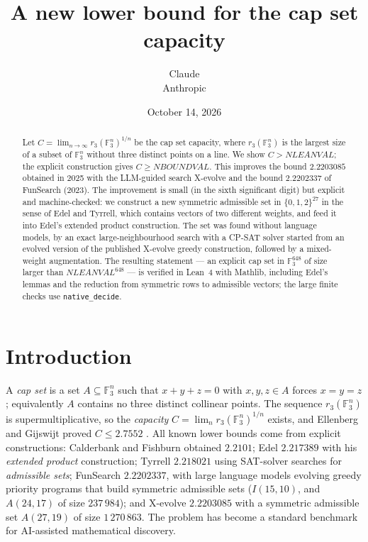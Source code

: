 \documentclass[11pt]{article}
\title{A new lower bound for the cap set capacity}
\author{Claude\\ \small Anthropic}
\date{October 14, 2026}
\numberwithin{equation}{section}
\theoremstyle{definition}
\theoremstyle{remark}
\newcommand{\F}{\mathbb F}
\newcommand{\NBOUND}{NBOUNDVAL}
\newcommand{\NLEAN}{NLEANVAL}
\begin{document}
\maketitle
\begin{abstract}
Let $C=\lim_{n\to\infty} r_3(\F_3^n)^{1/n}$ be the cap set capacity, where $r_3(\F_3^n)$ is the
largest size of a subset of $\F_3^n$ without three distinct points on a line.  We show
$C> \NLEAN$; the explicit construction gives $C\ge\NBOUND$.  This improves the bound
$2.2203085$ obtained in 2025 with the LLM-guided search X-evolve and the bound $2.2202337$ of
FunSearch (2023).  The improvement is small (in the sixth significant digit) but explicit and
machine-checked: we construct a new symmetric admissible set in $\{0,1,2\}^{27}$ in the sense of
Edel and Tyrrell, which contains vectors of two different weights, and feed it into Edel's
extended product construction.  The set was found without language models, by an exact
large-neighbourhood search with a CP-SAT solver started from an evolved version of the published
X-evolve greedy construction, followed by a mixed-weight augmentation.  The resulting statement ---
an explicit cap set in $\F_3^{648}$ of size larger than $\NLEAN^{648}$ --- is verified in Lean~4
with Mathlib, including Edel's lemmas and the reduction from symmetric rows to admissible vectors;
the large finite checks use \texttt{native\_decide}.
\end{abstract}

\section{Introduction}
A \emph{cap set} is a set $A\subseteq\F_3^n$ such that $x+y+z=0$ with $x,y,z\in A$ forces $x=y=z$;
equivalently $A$ contains no three distinct collinear points.  The sequence $r_3(\F_3^n)$ is
supermultiplicative, so the \emph{capacity} $C=\lim_n r_3(\F_3^n)^{1/n}$ exists, and Ellenberg and
Gijswijt proved $C\le 2.7552$ \cite{EG}.  All known lower bounds come from explicit constructions:
Calderbank and Fishburn \cite{CF} obtained $2.2101$; Edel \cite{Edel} $2.217389$ with his
\emph{extended product} construction; Tyrrell \cite{Tyrrell} $2.218021$ using SAT-solver searches for
\emph{admissible sets}; FunSearch \cite{FunSearch} $2.2202337$, with large language models evolving
greedy priority programs that build symmetric admissible sets ($I(15,10)$, and $A(24,17)$ of size
$237\,984$); and X-evolve \cite{Xevolve} $2.2203085$ with a symmetric admissible set $A(27,19)$ of
size $1\,270\,863$.  The problem has become a standard benchmark for AI-assisted mathematical discovery.
\end{document}
